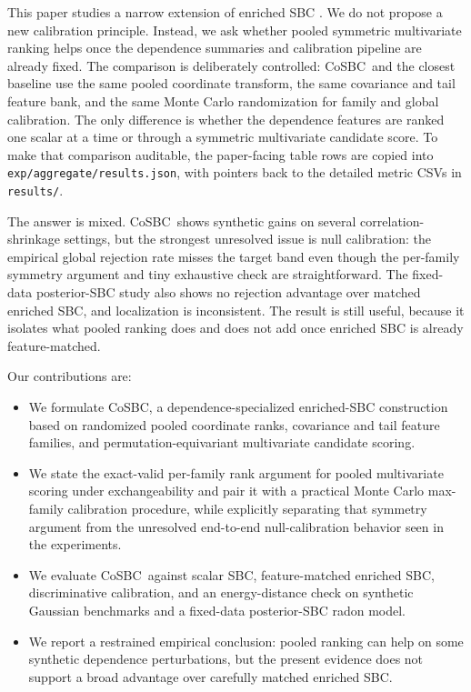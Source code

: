 \documentclass[10pt,twocolumn]{article}
\newcommand{\method}{CoSBC}
\newcommand{\1}{\mathbf{1}}
\begin{document}
This paper studies a narrow extension of enriched SBC \cite{Modrak2023}. We do not propose a new calibration principle. Instead, we ask whether pooled symmetric multivariate ranking helps once the dependence summaries and calibration pipeline are already fixed. The comparison is deliberately controlled: \method\ and the closest baseline use the same pooled coordinate transform, the same covariance and tail feature bank, and the same Monte Carlo randomization for family and global calibration. The only difference is whether the dependence features are ranked one scalar at a time or through a symmetric multivariate candidate score. To make that comparison auditable, the paper-facing table rows are copied into \texttt{exp/aggregate/results.json}, with pointers back to the detailed metric CSVs in \texttt{results/}.

The answer is mixed. \method\ shows synthetic gains on several correlation-shrinkage settings, but the strongest unresolved issue is null calibration: the empirical global rejection rate misses the target band even though the per-family symmetry argument and tiny exhaustive check are straightforward. The fixed-data posterior-SBC study also shows no rejection advantage over matched enriched SBC, and localization is inconsistent. The result is still useful, because it isolates what pooled ranking does and does not add once enriched SBC is already feature-matched.

Our contributions are:
\begin{itemize}
\item We formulate \method, a dependence-specialized enriched-SBC construction based on randomized pooled coordinate ranks, covariance and tail feature families, and permutation-equivariant multivariate candidate scoring.
\item We state the exact-valid per-family rank argument for pooled multivariate scoring under exchangeability and pair it with a practical Monte Carlo max-family calibration procedure, while explicitly separating that symmetry argument from the unresolved end-to-end null-calibration behavior seen in the experiments.
\item We evaluate \method\ against scalar SBC, feature-matched enriched SBC, discriminative calibration, and an energy-distance check on synthetic Gaussian benchmarks and a fixed-data posterior-SBC radon model.
\item We report a restrained empirical conclusion: pooled ranking can help on some synthetic dependence perturbations, but the present evidence does not support a broad advantage over carefully matched enriched SBC.
\end{itemize}
\end{document}
